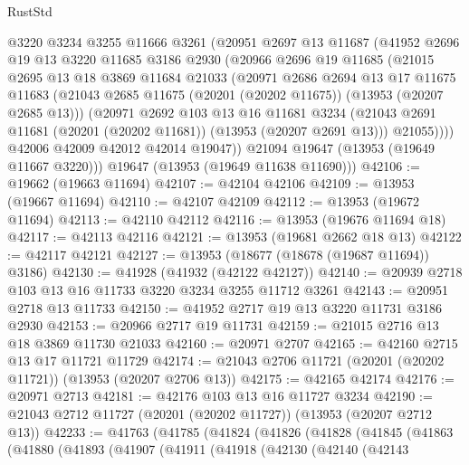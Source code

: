 \begin{lexlean}{RustStd}
\begin{coremodule}
        @3220
        @3234
        @3255
        @11666
        @3261
        (@20951
          @2697
          @13
          @11687
          (@41952
            @2696
            @19
            @13
            @3220
            @11685
            @3186
            @2930
            (@20966
              @2696
              @19
              @11685
              (@21015
                @2695
                @13
                @18
                @3869
                @11684
                @21033
                (@20971
                  @2686
                  @2694
                  @13
                  @17
                  @11675
                  @11683
                  (@21043 @2685 @11675 (@20201 (@20202 @11675)) (@13953 (@20207 @2685 @13)))
                  (@20971
                    @2692
                    @103
                    @13
                    @16
                    @11681
                    @3234
                    (@21043 @2691 @11681 (@20201 (@20202 @11681)) (@13953 (@20207 @2691 @13)))
                    @21055))))
            @42006
            @42009
            @42012
            @42014
            @19047))
        @21094
        @19647
        (@13953 (@19649 @11667 @3220)))
      @19647
      (@13953 (@19649 @11638 @11690)))
@42106 := @19662 (@19663 @11694)
@42107 := @42104 @42106
@42109 := @13953 (@19667 @11694)
@42110 := @42107 @42109
@42112 := @13953 (@19672 @11694)
@42113 := @42110 @42112
@42116 := @13953 (@19676 @11694 @18)
@42117 := @42113 @42116
@42121 := @13953 (@19681 @2662 @18 @13)
@42122 := @42117 @42121
@42127 := @13953 (@18677 (@18678 (@19687 @11694)) @3186)
@42130 := @41928 (@41932 (@42122 @42127))
@42140 := @20939 @2718 @103 @13 @16 @11733 @3220 @3234 @3255 @11712 @3261
@42143 := @20951 @2718 @13 @11733
@42150 := @41952 @2717 @19 @13 @3220 @11731 @3186 @2930
@42153 := @20966 @2717 @19 @11731
@42159 := @21015 @2716 @13 @18 @3869 @11730 @21033
@42160 := @20971 @2707
@42165 := @42160 @2715 @13 @17 @11721 @11729
@42174 := @21043 @2706 @11721 (@20201 (@20202 @11721)) (@13953 (@20207 @2706 @13))
@42175 := @42165 @42174
@42176 := @20971 @2713
@42181 := @42176 @103 @13 @16 @11727 @3234
@42190 := @21043 @2712 @11727 (@20201 (@20202 @11727)) (@13953 (@20207 @2712 @13))
@42233 := @41763
    (@41785
      (@41824
        (@41826
          (@41828
            (@41845
              (@41863
                (@41880
                  (@41893
                    (@41907
                      (@41911
                        (@41918
                          (@42130
                            (@42140
                              (@42143

\end{coremodule}
\end{lexlean}
